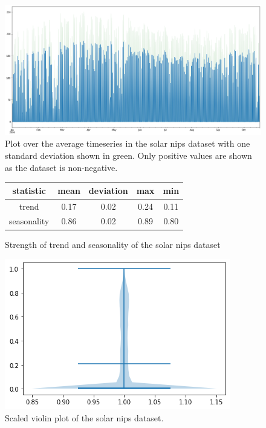 \begin{figure}[htb]
    \centering
    \includegraphics[width=\linewidth]{./img/solar_nips_plot.png}
    \caption{Plot over the average timeseries in the solar nips dataset with one standard deviation shown in green. Only positive values are shown as the dataset is non-negative.}
    \label{fig:solar_nips_plot}
    \endminipage\hfill
\end{figure}

\begin{figure}[htb]
    \centering
    \begin{center}
        \begin{tabular}{||c | c | c | c | c |}
            \hline
            statistic   & mean & deviation & max  & min  \\
            \hline
            trend       & 0.17 & 0.02      & 0.24 & 0.11 \\
            \hline
            seasonality & 0.86 & 0.02      & 0.89 & 0.80 \\
            \hline
            \hline
        \end{tabular}
        \caption{Strength of trend and seasonality of the solar nips dataset}
    \end{center}
    \endminipage\hfill
    \includegraphics[width=\linewidth]{./img/solar_nips_violin.png}
    \caption{Scaled violin plot of the solar nips dataset.}
    \label{fig:solar_nips_violin}
    \endminipage\hfill
\end{figure}


